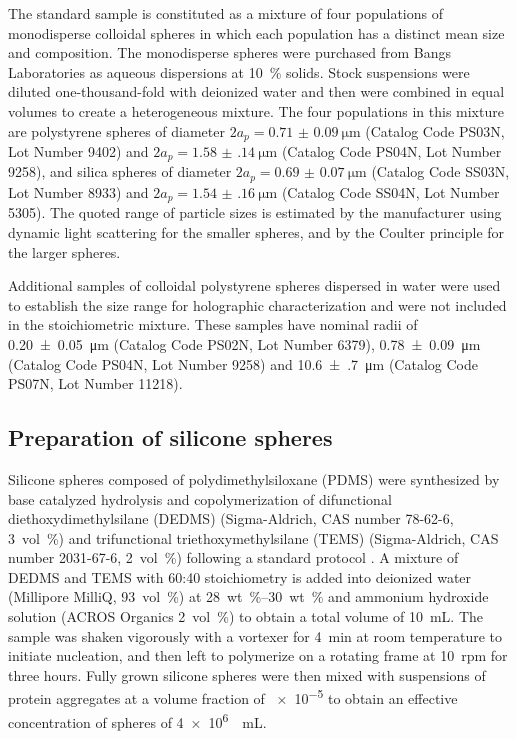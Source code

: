 The standard sample is constituted as a mixture of four
populations of monodisperse colloidal spheres in which
each population has a distinct mean size and composition.
The monodisperse spheres were purchased from Bangs Laboratories
as aqueous dispersions at \SI{10}{\percent} solids.
Stock suspensions were diluted one-thousand-fold with deionized
water and then were combined in equal volumes to create a
heterogeneous mixture.
The four populations in this mixture are
polystyrene spheres of diameter $2a_p = \SI{0.71(9)}{\um}$
(Catalog Code PS03N, Lot Number 9402)
and $2a_p = \SI{1.58(14)}{\um}$
(Catalog Code PS04N, Lot Number 9258),
and silica spheres of diameter $2a_p = \SI{0.69(7)}{\um}$
(Catalog Code SS03N, Lot Number 8933)
and $2a_p = \SI{1.54(16)}{\um}$
(Catalog Code SS04N, Lot Number 5305).
The quoted range of particle sizes is estimated by
the manufacturer using
dynamic light scattering for the smaller spheres,
and by the Coulter principle for the larger spheres.

Additional samples of colloidal polystyrene spheres dispersed in water were used to establish the size range for holographic characterization and were not included in the stoichiometric mixture. These samples have nominal radii of \SI{0.20(5)}{\um} (Catalog Code PS02N, Lot Number 6379), \SI{0.78(9)}{\um} (Catalog Code PS04N, Lot Number 9258) and \SI{10.6(7)}{\um} (Catalog Code PS07N, Lot Number 11218).

\subsection{Preparation of silicone spheres}
\label{sec:silicone}

Silicone spheres composed of polydimethylsiloxane (PDMS)
were synthesized by base catalyzed hydrolysis and copolymerization
of difunctional diethoxydimethylsilane (DEDMS) 
(Sigma-Aldrich, CAS number 78-62-6, \SI{3}{vol\percent})
and trifunctional triethoxymethylsilane (TEMS) 
(Sigma-Aldrich, CAS number 2031-67-6, \SI{2}{vol\percent})
following a standard protocol \cite{obey94,goller97}.
A mixture of DEDMS and TEMS with 60:40 stoichiometry
is added into deionized water
(Millipore MilliQ, \SI{93}{vol\percent}) at \SIrange{28}{30}{wt\percent}
and ammonium hydroxide solution (ACROS Organics \SI{2}{vol\percent})
to obtain a total volume of \SI{10}{\mL}.
The sample was shaken vigorously with a vortexer for \SI{4}{min}
at room temperature to initiate nucleation, and then
left to polymerize on a rotating frame at \SI{10}{rpm} for three hours.
Fully grown silicone spheres were then mixed with
suspensions of protein aggregates at a volume fraction of \num{e-5}
to obtain an effective concentration of spheres of
\SI{4e6}{\per\mL}.  

